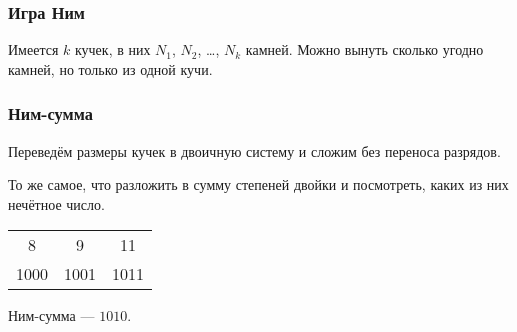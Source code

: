 \documentclass[aspectratio=1610,12pt,notheorems]{beamer}
\begin{document}
\begin{frame} \frametitle{Игра Ним}
	Имеется $k$ кучек, в них $N_1$, $N_2$, \ldots, $N_k$ камней. Можно вынуть сколько угодно камней, но только из одной кучи. \medskip

\begin{center} \end{center}
\end{frame}


\begin{frame} \frametitle{Ним-сумма}
	Переведём размеры кучек в двоичную систему и сложим без переноса разрядов.

	То же самое, что разложить в сумму степеней двойки и посмотреть, каких из них нечётное число. \medskip

\begin{center}\begin{tabular}{ccc}
8 & 9 & 11 \\
{\small 1000} & {\small 1001} & {\small 1011}
\end{tabular}

Ним-сумма — $1010$. \end{center}
\end{frame}
\end{document}
